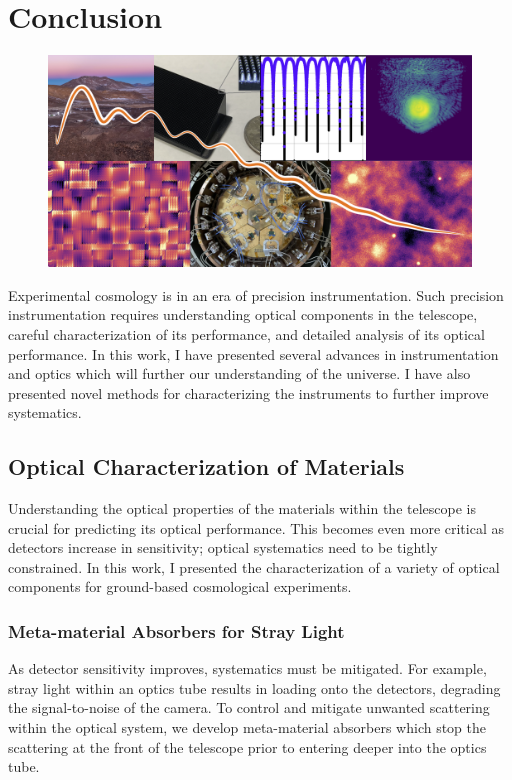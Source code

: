 \chapter{Conclusion}
\label{ch:conclusion}
\begin{figure}[H]
    \centering
    \includegraphics[width = \textwidth]{Figures/conclusion.png}
    \label{fig:finalfigure}
\end{figure}
Experimental cosmology is in an era of precision instrumentation.  Such precision instrumentation requires understanding optical components in the telescope, careful characterization of its performance, and detailed analysis of its optical performance.  In this work, I have presented several advances in instrumentation and optics which will further our understanding of the universe.  I have also presented novel methods for characterizing the instruments to further improve systematics.

\section{Optical Characterization of Materials}
Understanding the optical properties of the materials within the telescope is crucial for predicting its optical performance.  This becomes even more critical as detectors increase in sensitivity; optical systematics need to be tightly constrained.
In this work, I presented the characterization of a variety of optical components for ground-based cosmological experiments.  

\subsection{Meta-material Absorbers for Stray Light}
As detector sensitivity improves, systematics must be mitigated. For example, stray light within an optics tube results in loading onto the detectors, degrading the signal-to-noise of the camera.  To control and mitigate unwanted scattering within the optical system, we develop meta-material absorbers which stop the scattering at the front of the telescope prior to entering deeper into the optics tube.  
 
